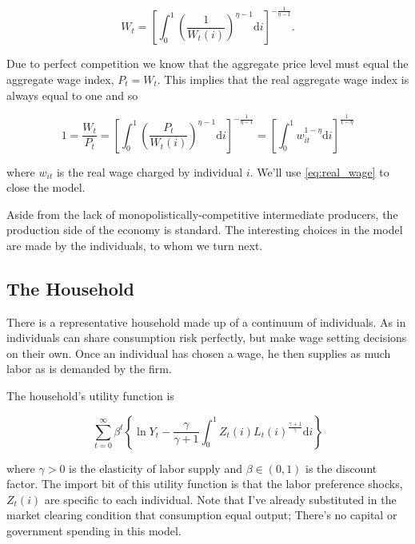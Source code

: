 \documentclass[12pt,a4paper]{scrartcl}            %
\begin{document}
\begin{equation} \label{eq:wage_index}
    W_t = \left[\int_{0}^{1}\left(\frac{1}{W_t(i)}\right)^{\eta - 1} \mathrm{d}i \right]^{-\frac{1}{\eta - 1}}.
\end{equation}

Due to perfect competition we know that the aggregate price level must equal the aggregate wage index, $P_t = W_t$.  This implies that the real aggregate wage index is always equal to one and so

\begin{equation} \label{eq:real_wage}
    1 = \frac{W_t}{P_t} = \left[\int_{0}^{1} \left( \frac{P_t}{W_t(i)} \right)^{\eta - 1} \mathrm{d}i \right]^{-\frac{1}{\eta - 1} } = \left[\int_{0}^{1} \! w_{it}^{1 - \eta} \mathrm{d}i \right]^{ \frac{1}{1 - \eta} }
\end{equation}

where $w_{it}$ is the real wage charged by individual $i$.  We'll use \ref{eq:real_wage} to close the model.

Aside from the lack of monopolistically-competitive intermediate producers, the production side of the economy is standard.
The interesting choices in the model are made by the individuals, to whom we turn next.

\subsection{The Household}
\label{sub:The Household}

There is a representative household made up of a continuum of individuals.
As in \cite{erceg_henderson_levin_1999} individuals can share consumption risk perfectly, but make wage setting decisions on their own.
Once an individual has chosen a wage, he then supplies as much labor as is demanded by the firm.

The household's utility function is

\begin{equation} \label{eq:utility}
    \sum_{t=0}^{\infty} \beta^t \left\{\ln Y_t - \frac{\gamma}{\gamma + 1} \int_{0}^{1} Z_t(i)L_t(i)^{\frac{\gamma + 1}{\gamma}}\mathrm{d}i\right\}
\end{equation}

where $\gamma > 0$ is the elasticity of labor supply and $\beta \in (0, 1)$ is the discount factor.
The import bit of this utility function is that the labor preference shocks, $Z_t(i)$ are specific to each individual.
Note that I've already substituted in the market clearing condition that consumption equal output;
There's no capital or government spending in this model.
\end{document}
